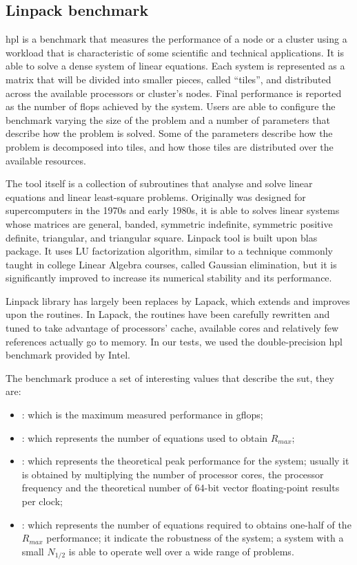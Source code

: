 \subsection{Linpack benchmark}
\label{sec:measurements-cpu-linpack}
\ac{hpl} is a benchmark that measures the performance of a node or a cluster using a workload
that is characteristic of some scientific and technical applications. It is able to solve a dense
system of linear equations. Each system is represented as a matrix that will be divided into smaller
pieces, called ``tiles'', and distributed across the available processors or cluster's nodes. Final
performance is reported as the number of \ac{flops} achieved by the system. Users are able to configure
the benchmark varying the size of the problem and a number of parameters that describe how the problem
is solved. Some of the parameters describe how the problem is decomposed into tiles, and how those
tiles are distributed over the available resources.

The tool itself is a collection of subroutines that analyse and solve linear equations and linear
least-square problems. Originally was designed for supercomputers in the 1970s and early 1980s, it is able
to solves linear systems whose matrices are general, banded, symmetric indefinite, symmetric positive
definite, triangular, and triangular square. Linpack tool is built upon \ac{blas} package. It
uses LU factorization algorithm, similar to a technique commonly taught in college Linear Algebra courses,
called Gaussian elimination, but it is significantly improved to increase its numerical stability and
its performance.

Linpack library has largely been replaces by Lapack, which extends and improves upon the routines. In
Lapack, the routines have been carefully rewritten and tuned to take advantage of processors' cache,
available cores and relatively few references actually go to memory. In our tests, we used the
double-precision \ac{hpl} benchmark provided by Intel.

The benchmark produce a set of interesting values that describe the \ac{sut}, they are:

\begin{itemize}
	\item{: which is the maximum measured performance in \ac{gflops};}
	\item{: which represents the number of equations used to obtain $R_{max}$;}
	\item{: which represents the theoretical peak performance for the system; usually
		it is obtained by multiplying the number of processor cores, the processor frequency and the
		theoretical number of 64-bit vector floating-point results per clock;}
	\item{: which represents the number of equations required to obtains one-half
		of the $R_{max}$ performance; it indicate the robustness of the system; a system with
		a small $N_{1/2}$ is able to operate well over a wide range of problems.}
\end{itemize}

